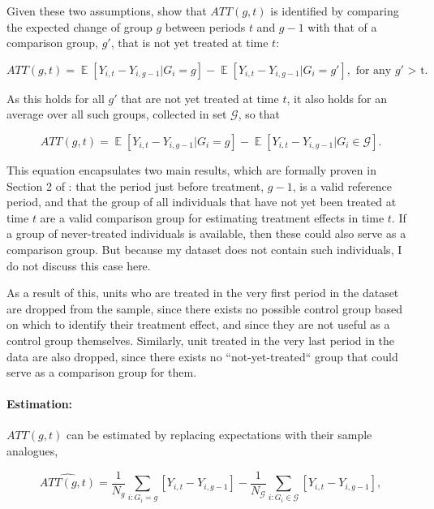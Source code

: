 Given these two assumptions, \citet{callaway2021difference} show that
$ATT(g,t)$ is identified by comparing the expected change of group $g$ between
periods $t$ and $g-1$ with that of a comparison group, $g'$, that is not yet
treated at time $t$:

\begin{equation}
    ATT(g,t) = \mathop{\mathbb{E}}[Y_{i,t} - Y_{i,g-1}|G_i = g] -
    \mathop{\mathbb{E}}[Y_{i,t} - Y_{i,g-1}|G_i = g'], \text{ for any $g'$ >
    t}.
\end{equation}

As this holds for all $g'$ that are not yet treated at time $t$, it also holds
for an average over all such groups, collected in set $\mathcal{G}$, so that

\begin{equation}
    ATT(g,t) = \mathop{\mathbb{E}}[Y_{i,t} - Y_{i,g-1}|G_i = g] -
    \mathop{\mathbb{E}}[Y_{i,t} - Y_{i,g-1}|G_i \in \mathcal{G}].
\end{equation}

This equation encapsulates two main results, which are formally proven in
Section 2 of \citet{callaway2021difference}: that the period just before
treatment, $g-1$, is a valid reference period, and that the group of all
individuals that have not yet been treated at time $t$ are a valid comparison
group for estimating treatment effects in time $t$. If a group of never-treated
individuals is available, then these could also serve as a comparison group.
But because my dataset does not contain such individuals, I do not discuss this
case here.

As a result of this, units who are treated in the very first period in the
dataset are dropped from the sample, since there exists no possible control
group based on which to identify their treatment effect, and since they are not
useful as a control group themselves. Similarly, unit treated in the very last
period in the data are also dropped, since there exists no ``not-yet-treated``
group that could serve as a comparison group for them.


\paragraph{Estimation:}%
\label{par:estimation_}

$ATT(g,t)$ can be estimated by replacing expectations with their sample
analogues,

\begin{equation}
    \widehat{ATT(g,t)} = \frac{1}{N_g}\sum_{i:G_i=g}[Y_{i,t} - Y_{i, g-1}] -
    \frac{1}{N_\mathcal{G}}\sum_{i:G_i \in \mathcal{G}}[Y_{i,t} - Y_{i, g-1}],
\end{equation}


